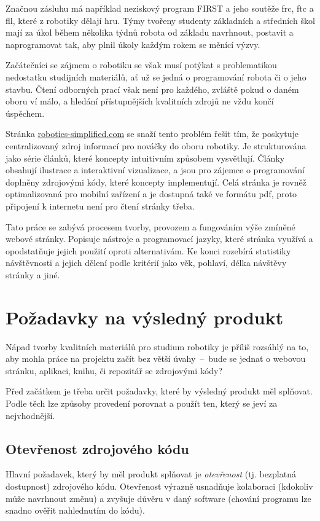 \documentclass[a4paper, 12pt]{article}
\begin{document}
  Značnou zásluhu má například neziskový program FIRST a jeho soutěže \gls{frc}, \gls{ftc} a \gls{fll}, které z robotiky dělají hru. Týmy tvořeny studenty základních a středních škol mají za úkol během několika týdnů robota od základu navrhnout, postavit a naprogramovat tak, aby plnil úkoly každým rokem se měnící výzvy.

  Začátečníci se zájmem o robotiku se však musí potýkat s problematikou nedostatku studijních materiálů, ať už se jedná o programování robota či o jeho stavbu. Čtení odborných prací však není pro každého, zvláště pokud o daném oboru ví málo, a hledání přístupnějších kvalitních zdrojů ne vždu končí úspěchem.

  Stránka \url{robotics-simplified.com} se snaží tento problém řešit tím, že poskytuje centralizovaný zdroj informací pro nováčky do oboru robotiky. Je strukturována jako série článků, které koncepty intuitivním způsobem vysvětlují. Články obsahují ilustrace a interaktivní vizualizace, a jsou pro zájemce o programování doplněny zdrojovými kódy, které koncepty implementují. Celá stránka je rovněž optimalizovaná pro mobilní zařízení a je dostupná také ve formátu \gls{pdf}, proto připojení k internetu není pro čtení stránky třeba.

  Tato práce se zabývá procesem tvorby, provozem a fungováním výše zmíněné webové stránky. Popisuje nástroje a programovací jazyky, které stránka využívá a opodstatňuje jejich použití oproti alternativám. Ke konci rozebírá statistiky návštěvnosti a jejich dělení podle kritérií jako věk, pohlaví, délka návštěvy stránky a jiné.

  \newpage

  \section{Požadavky na výsledný produkt} \label{sec:Požadavky na výsledný produkt}
  Nápad tvorby kvalitních materiálů pro studium robotiky je příliš rozsáhlý na to, aby mohla práce na projektu začít bez větší úvahy~--~bude se jednat o webovou stránku, aplikaci, knihu, či repozitář se zdrojovými kódy?

  Před začátkem je třeba určit požadavky, které by výsledný produkt měl splňovat. Podle těch lze způsoby provedení porovnat a použít ten, který se jeví za nejvhodnější.


  \subsection{Otevřenost zdrojového kódu}
  Hlavní požadavek, který by měl produkt splňovat je \emph{otevřenost} (tj. bezplatná dostupnost) zdrojového kódu. Otevřenost výrazně usnadňuje kolaboraci (kdokoliv může navrhnout změnu) a zvyšuje důvěru v daný software (chování programu lze snadno ověřit nahlednutím do kódu).
\end{document}
